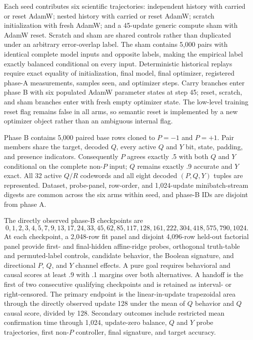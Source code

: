 \documentclass[11pt,a4paper]{article}
\begin{document}
Each seed contributes six scientific trajectories: independent history with carried or reset AdamW; nested history with carried or reset AdamW; scratch initialization with fresh AdamW; and a 45-update generic compute sham with AdamW reset. Scratch and sham are shared controls rather than duplicated under an arbitrary error-overlap label. The sham contains 5,000 pairs with identical complete model inputs and opposite labels, making the empirical label exactly balanced conditional on every input. Deterministic historical replays require exact equality of initialization, final model, final optimizer, registered phase-A measurements, samples seen, and optimizer steps. Carry branches enter phase B with six populated AdamW parameter states at step 45; reset, scratch, and sham branches enter with fresh empty optimizer state. The low-level training reset flag remains false in all arms, so semantic reset is implemented by a new optimizer object rather than an ambiguous internal flag.

Phase B contains 5,000 paired base rows cloned to $P=-1$ and $P=+1$. Pair members share the target, decoded $Q$, every active $Q$ and $Y$ bit, state, padding, and presence indicators. Consequently $P$ agrees exactly .5 with both $Q$ and $Y$ conditional on the complete non-$P$ input; $Q$ remains exactly .9 accurate and $Y$ exact. All 32 active $Q/R$ codewords and all eight decoded $(P,Q,Y)$ tuples are represented. Dataset, probe-panel, row-order, and 1,024-update minibatch-stream digests are common across the six arms within seed, and phase-B IDs are disjoint from phase A.

The directly observed phase-B checkpoints are
\[
0,1,2,3,4,5,7,9,13,17,24,33,45,62,85,117,128,161,222,304,418,575,790,1024.
\]
At each checkpoint, a 2,048-row fit panel and disjoint 4,096-row held-out factorial panel provide first- and final-hidden affine-ridge probes, orthogonal truth-table and permuted-label controls, candidate behavior, the Boolean signature, and directional $P$, $Q$, and $Y$ channel effects. A pure goal requires behavioral and causal scores at least .9 with .1 margins over both alternatives. A handoff is the first of two consecutive qualifying checkpoints and is retained as interval- or right-censored. The primary endpoint is the linear-in-update trapezoidal area through the directly observed update 128 under the mean of $Q$ behavior and $Q$ causal score, divided by 128. Secondary outcomes include restricted mean confirmation time through 1,024, update-zero balance, $Q$ and $Y$ probe trajectories, first non-$P$ controller, final signature, and target accuracy.
\end{document}
